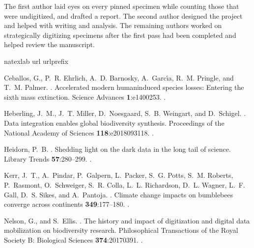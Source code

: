 \begin{multicols}{2}
The first author laid eyes on every pinned specimen while counting those that were undigitized, and drafted a report. The second author designed the project and helped with writing and analysis. The remaining authors worked on strategically digitizing specimens after the first pass had been completed and helped review the manuscript.

%

\begin{thebibliography}{11}
\expandafter\ifx\csname natexlab\endcsname\relax\def\natexlab#1{#1}\fi
\expandafter\ifx\csname url\endcsname\relax
  \def\url#1{{\tt #1}}\fi
\expandafter\ifx\csname urlprefix\endcsname\relax\def\urlprefix{{\small URL}
  }\fi

Ceballos, G., P.~R. Ehrlich, A.~D. Barnosky, A.~Garc{\'\i}a, R.~M. Pringle, and
  T.~M. Palmer.
.
\newblock Accelerated modern human{\textendash}induced species losses: Entering
  the sixth mass extinction.
\newblock Science Advances {\bfseries 1}:e1400253.
\newblock {}.

Heberling, J.~M., J.~T. Miller, D.~Noesgaard, S.~B. Weingart, and D.~Schigel.
.
\newblock Data integration enables global biodiversity synthesis.
\newblock Proceedings of the National Academy of Sciences {\bfseries
  118}:e2018093118.
\newblock {}.

Heidorn, P.~B.
.
\newblock Shedding light on the dark data in the long tail of science.
\newblock Library Trends {\bfseries 57}:280--299.
\newblock {}.

Kerr, J.~T., A.~Pindar, P.~Galpern, L.~Packer, S.~G. Potts, S.~M. Roberts,
  P.~Rasmont, O.~Schweiger, S.~R. Colla, L.~L. Richardson, D.~L. Wagner, L.~F.
  Gall, D.~S. Sikes, and A.~Pantoja.
.
\newblock Climate change impacts on bumblebees converge across continents
  {\bfseries 349}:177--180.
\newblock {}.

Nelson, G., and S.~Ellis.
.
\newblock The history and impact of digitization and digital data mobilization
  on biodiversity research.
\newblock Philosophical Transactions of the Royal Society B: Biological
  Sciences {\bfseries 374}:20170391.
\newblock {}.


\end{thebibliography}
\end{multicols}
